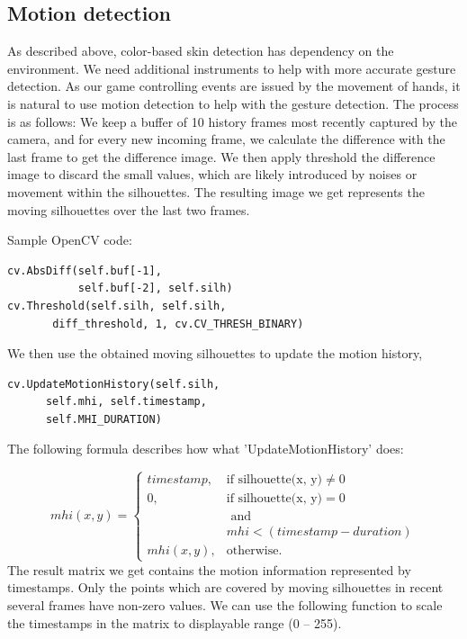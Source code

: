 \documentclass[10pt,twocolumn,letterpaper]{article}
\begin{document}
\subsection{Motion detection}
As described above, color-based skin detection has dependency on the environment. 
We need additional instruments to help with more accurate gesture detection. As our 
game controlling events are issued by the movement of hands, it is natural to use motion 
detection to help with the gesture detection. The process is as follows:
We keep a buffer of 10 history frames most recently captured by the camera, 
and for every new incoming frame, we calculate the difference with the last frame 
to get the difference image. We then apply threshold the difference image to discard 
the small values, which are likely introduced by noises or movement within the 
silhouettes. The resulting image we get represents the moving silhouettes over the 
last two frames.

Sample OpenCV code:
\begin{verbatim}
cv.AbsDiff(self.buf[-1], 
           self.buf[-2], self.silh)
cv.Threshold(self.silh, self.silh, 
       diff_threshold, 1, cv.CV_THRESH_BINARY)
\end{verbatim}

We then use the obtained moving silhouettes to update the motion history,
\begin{verbatim}
cv.UpdateMotionHistory(self.silh, 
      self.mhi, self.timestamp, 
      self.MHI_DURATION)
\end{verbatim}

The following formula describes how what 'UpdateMotionHistory' does:

\begin{equation}
mhi(x, y) = \begin{cases} timestamp, & \mbox{if silhouette(x, y)} \neq 0 \\ 
                          0, & \mbox{if silhouette(x, y)} = 0 \\
			  & \mbox{ and } \\
			  & mhi < (timestamp - duration) \\
			  mhi(x, y),  & \mbox{otherwise}.
			  \end{cases}
\end{equation}
The result matrix we get contains the motion information represented by timestamps. 
Only the points which are covered by moving silhouettes in recent several frames 
have non-zero values. We can use the following function to scale the timestamps 
in the matrix to displayable range (0 – 255).
\end{document}
